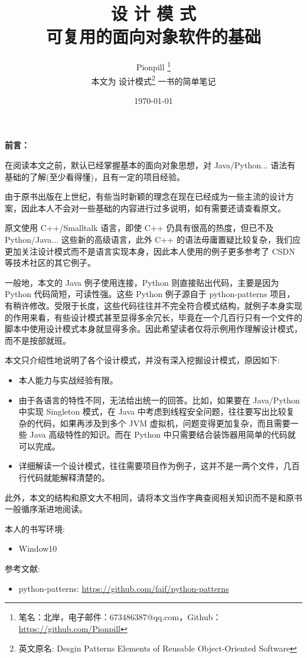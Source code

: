 \documentclass{PionpillNote-book}
\title{\Huge{设 \hspace{17pt} 计 \hspace{17pt} 模 \hspace{17pt} 式} \\ \large{可复用的面向对象软件的基础}}
\author{
    Pionpill \footnote{笔名：北岸，电子邮件：673486387@qq.com，Github：\url{https://github.com/Pionpill}} \\
    本文为 设计模式\footnote{英文原名: Desgin Patterns Elements of Reusable Object-Oriented Software} 一书的简单笔记\\
}
\date{\today}
\begin{document}
\pagestyle{plain}

\maketitle

\noindent\textbf{前言：}

在阅读本文之前，默认已经掌握基本的面向对象思想，对 Java/Python... 语法有基础的了解(至少看得懂)，且有一定的项目经验。

由于原书出版在上世纪，有些当时新颖的理念在现在已经成为一些主流的设计方案，因此本人不会对一些基础的内容进行过多说明，如有需要还请查看原文。

原文使用 C++/Smalltalk 语言，即使 C++ 仍具有很高的热度，但已不及 Python/Java... 这些新的高级语言，此外 C++ 的语法毋庸置疑比较复杂，我们应更加关注设计模式而不是语言实现本身，因此本人使用的例子更多参考了 CSDN 等技术社区的其它例子。

一般地，本文的 Java 例子使用连接，Python 则直接贴出代码，主要是因为 Python 代码简短，可读性强。这些 Python 例子源自于 python-patterns 项目，有稍许修改。受限于长度，这些代码往往并不完全符合模式结构，就例子本身实现的作用来看，有些设计模式甚至显得多余冗长，毕竟在一个几百行只有一个文件的脚本中使用设计模式本身就显得多余。因此希望读者仅将示例用作理解设计模式，而不是按部就班。

本文只介绍性地说明了各个设计模式，并没有深入挖掘设计模式，原因如下:
\begin{itemize}
    \item 本人能力与实战经验有限。
    \item 由于各语言的特性不同，无法给出统一的回答。比如，如果要在 Java/Python 中实现 Singleton 模式，在 Java 中考虑到线程安全问题，往往要写出比较复杂的代码，如果再涉及到多个 JVM 虚拟机，问题变得更加复杂，而且需要一些 Java 高级特性的知识。而在 Python 中只需要结合装饰器用简单的代码就可以完成。
    \item 详细解读一个设计模式，往往需要项目作为例子，这并不是一两个文件，几百行代码就能解释清楚的。
\end{itemize}

此外，本文的结构和原文大不相同，请将本文当作字典查阅相关知识而不是和原书一般循序渐进地阅读。

本人的书写环境:
\begin{itemize}
    \item Window10
\end{itemize}

参考文献:
\begin{itemize}
    \item python-patterns: \url{https://github.com/faif/python-patterns}
\end{itemize}
\end{document}
